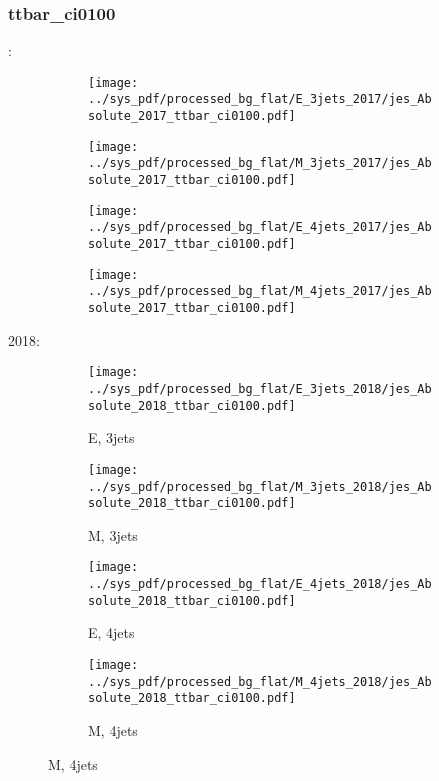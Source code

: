 \documentclass{beamer}
\begin{document}
\begin{frame}
\frametitle{ttbar_ci0100}
\fontsize{5}{1}:
\begin{figure}
\centering
\begin{subfigure}[b]{0.24\textwidth}
\texttt{[image: ../sys\_pdf/processed\_bg\_flat/E\_3jets\_2017/jes\_Absolute\_2017\_ttbar\_ci0100.pdf]}
\end{subfigure}
\begin{subfigure}[b]{0.24\textwidth}
\texttt{[image: ../sys\_pdf/processed\_bg\_flat/M\_3jets\_2017/jes\_Absolute\_2017\_ttbar\_ci0100.pdf]}
\end{subfigure}
\begin{subfigure}[b]{0.24\textwidth}
\texttt{[image: ../sys\_pdf/processed\_bg\_flat/E\_4jets\_2017/jes\_Absolute\_2017\_ttbar\_ci0100.pdf]}
\end{subfigure}
\begin{subfigure}[b]{0.24\textwidth}
\texttt{[image: ../sys\_pdf/processed\_bg\_flat/M\_4jets\_2017/jes\_Absolute\_2017\_ttbar\_ci0100.pdf]}
\end{subfigure}
\end{figure}
2018:
\begin{figure}
\centering
\begin{subfigure}[b]{0.24\textwidth}
\texttt{[image: ../sys\_pdf/processed\_bg\_flat/E\_3jets\_2018/jes\_Absolute\_2018\_ttbar\_ci0100.pdf]}
\captionsetup{font=tiny}
\caption{E, 3jets}
\end{subfigure}
\begin{subfigure}[b]{0.24\textwidth}
\texttt{[image: ../sys\_pdf/processed\_bg\_flat/M\_3jets\_2018/jes\_Absolute\_2018\_ttbar\_ci0100.pdf]}
\captionsetup{font=tiny}
\caption{M, 3jets}
\end{subfigure}
\begin{subfigure}[b]{0.24\textwidth}
\texttt{[image: ../sys\_pdf/processed\_bg\_flat/E\_4jets\_2018/jes\_Absolute\_2018\_ttbar\_ci0100.pdf]}
\captionsetup{font=tiny}
\caption{E, 4jets}
\end{subfigure}
\begin{subfigure}[b]{0.24\textwidth}
\texttt{[image: ../sys\_pdf/processed\_bg\_flat/M\_4jets\_2018/jes\_Absolute\_2018\_ttbar\_ci0100.pdf]}
\captionsetup{font=tiny}
\caption{M, 4jets}
\end{subfigure}
\end{figure}
\end{frame}
\end{document}
